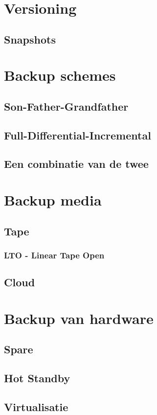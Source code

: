 \documentclass[a4paper,12pt,twoside,openright,titlepage]{book}
\begin{document}
\chapter{Versioning}

\section{Snapshots}


\chapter{Backup schemes}
\section{Son-Father-Grandfather}

\section{Full-Differential-Incremental}

\section{Een combinatie van de twee}


\chapter{Backup media}

\section{Tape}

\subsection{LTO - Linear Tape Open}

\section{Cloud}


\chapter{Backup van hardware}

\section{Spare}

\section{Hot Standby}

\section{Virtualisatie}


\backmatter
\printindex
\end{document}
